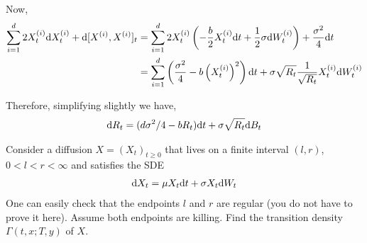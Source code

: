 \begin{solution}[Solution]
Now, 
\begin{align*}
    \sum_{i=1}^{d} 2X_t^{(i)} \mathrm{d} X_t^{(i)} + \mathrm{d}[X^{(i)},X^{(i)}]_t 
    &= \sum_{i=1}^{d} 2X_t^{(i)} \left( -\dfrac{b}{2} X_t^{(i)}\mathrm{d} t + \dfrac{1}{2} \sigma \mathrm{d} W_t^{(i)} \right) + \dfrac{\sigma^2}{4}\mathrm{d} t
    \\&= \sum_{i=1}^{d} \left( \dfrac{\sigma^2}{4} - b \left(X_t^{(i)}\right)^2\right)\mathrm{d} t + \sigma \sqrt{R_t} \dfrac{1}{\sqrt{R_t}}X_t^{(i)} \mathrm{d} W_t^{(i)} 
\end{align*}

Therefore, simplifying slightly we have,
\begin{align*}
    \mathrm{d} R_t = (d\sigma^2/4-b R_t) \mathrm{d} t + \sigma \sqrt{R_t} \mathrm{d} B_t
\end{align*}
\end{solution}

\begin{problem}[Exercise 9.4]
\end{problem}

\begin{solution}[Solution]
\end{solution}


\begin{problem}[Exercise 9.5]
    Consider a diffusion \( X = (X_t)_{t\geq 0} \) that lives on a finite interval \( (l,r) \), \( 0 < l < r < \infty \) and satisfies the SDE
    \begin{align*}
        \mathrm{d} X_t = \mu X_t\mathrm{d} t + \sigma X_t \mathrm{d} W_t
    \end{align*}
    One can easily check that the endpoints \( l \) and \( r \) are regular (you do not have to prove it here). Assume both endpoints are killing. Find the transition density \( \Gamma(t,x ;T,y) \) of \( X \).
\end{problem}

